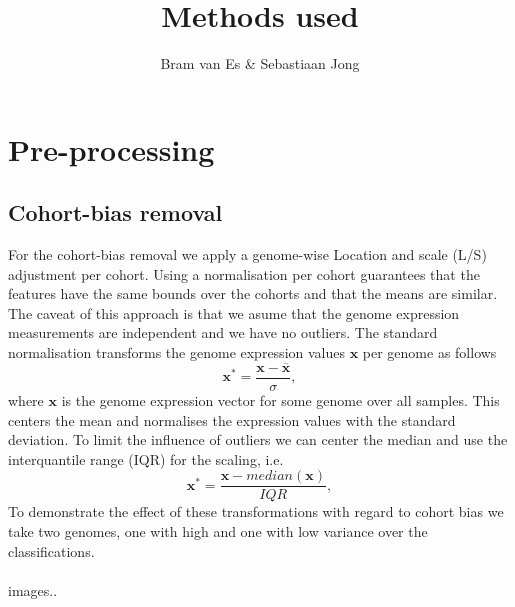 \documentclass[a4paper,10pt]{article}
\title{Methods used}
\author{Bram van Es \& Sebastiaan Jong}
\begin{document}
\begin{abstract}

\end{abstract}




\section{Pre-processing}

\subsection{Cohort-bias removal}
%
For the cohort-bias removal we apply a genome-wise Location and scale (L/S) adjustment per cohort.
Using a normalisation per cohort guarantees that the features have the same bounds 
over the cohorts and that the means are similar. The caveat of this approach is that we asume 
that the genome expression measurements are independent and we have no outliers.
%
The standard normalisation transforms the genome expression values $\mathbf{x}$ per genome as follows
\begin{equation}
  \mathbf{x}^* = \frac{\mathbf{x} - \overline{\mathbf{x}}}{\sigma},
\end{equation}
%
where $\mathbf{x}$ is the genome expression vector for some genome over all samples. 
This centers the mean and normalises the  expression values with the standard deviation. 
To limit the influence of outliers we can center the median and use the interquantile range (IQR)
for the scaling, i.e.
%
\begin{equation}
  \mathbf{x}^* = \frac{\mathbf{x} - median\left({\mathbf{x}}\right)}{IQR},
\end{equation}
%
%
To demonstrate the effect of these transformations with regard to cohort bias we take two genomes, one with high and one with low variance
over the classifications. \\ \\
%
images..
\end{document}

